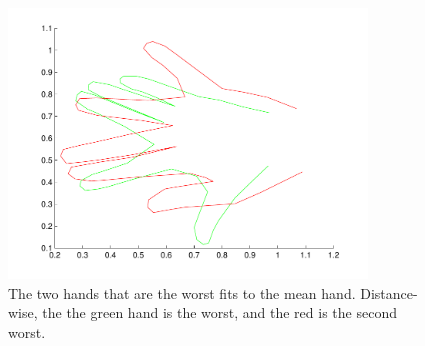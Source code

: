 \begin{figure}[!htbp]
  \centering
  \includegraphics[width=0.85\textwidth]{./images/q33}
  \caption{The two hands that are the worst fits to the mean hand. Distance-wise, the the green hand is the worst, and the red is the second worst.}
  \label{fig:q33}
\end{figure}

